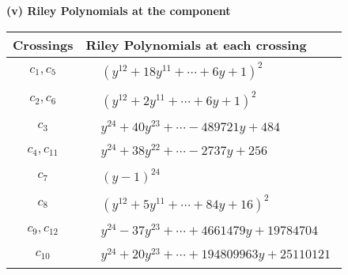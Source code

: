 \documentclass[1p]{elsarticle_modified}
\theoremstyle{definition}
\begin{document}
\newpage\renewcommand{\arraystretch}{1}
\flushleft \textbf{(v) Riley Polynomials at the component}\newline \\
\begin{tabular}{m{50pt}|m{274pt}}
Crossings & \hspace{64pt}Riley Polynomials at each crossing \\
\hline $$\begin{aligned}c_{1},c_{5}\end{aligned}$$&$\begin{aligned}
&(y^{12}+18 y^{11}+\cdots+6 y+1)^{2}
\end{aligned}$\\
\hline $$\begin{aligned}c_{2},c_{6}\end{aligned}$$&$\begin{aligned}
&(y^{12}+2 y^{11}+\cdots+6 y+1)^{2}
\end{aligned}$\\
\hline $$\begin{aligned}c_{3}\end{aligned}$$&$\begin{aligned}
&y^{24}+40 y^{23}+\cdots-489721 y+484
\end{aligned}$\\
\hline $$\begin{aligned}c_{4},c_{11}\end{aligned}$$&$\begin{aligned}
&y^{24}+38 y^{22}+\cdots-2737 y+256
\end{aligned}$\\
\hline $$\begin{aligned}c_{7}\end{aligned}$$&$\begin{aligned}
&(y-1)^{24}
\end{aligned}$\\
\hline $$\begin{aligned}c_{8}\end{aligned}$$&$\begin{aligned}
&(y^{12}+5 y^{11}+\cdots+84 y+16)^{2}
\end{aligned}$\\
\hline $$\begin{aligned}c_{9},c_{12}\end{aligned}$$&$\begin{aligned}
&y^{24}-37 y^{23}+\cdots+4661479 y+19784704
\end{aligned}$\\
\hline $$\begin{aligned}c_{10}\end{aligned}$$&$\begin{aligned}
&y^{24}+20 y^{23}+\cdots+194809963 y+25110121
\end{aligned}$\\
\hline
\end{tabular}\\~\\
\end{document}
